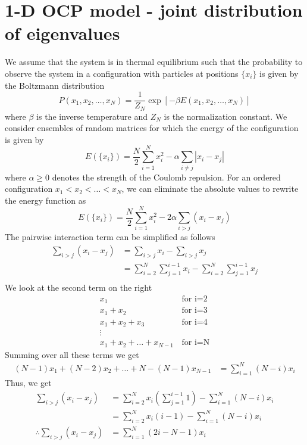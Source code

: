 \documentclass[11pt]{article}
\begin{document}
\section{1-D OCP model - joint distribution of eigenvalues}
We assume that the system is in thermal equilibrium such that the probability to observe the system in a configuration with particles at positions $\{x_i\}$ is given by the Boltzmann distribution
\begin{equation}
P(x_1,x_2,\hdots,x_N)=\frac{1}{Z_N}\exp[-\beta E(x_1,x_2,\hdots,x_N)]\label{eq-jpdf}
\end{equation}
where $\beta$ is the inverse temperature and $Z_N$ is the normalization constant. We consider ensembles of random matrices for which the energy of the configuration is given by
\begin{equation}
E(\{x_i\})=\frac{N}{2}\sum_{i=1}^Nx_i^2-\alpha \sum_{i\neq j}|x_i-x_j|\label{eq-energy}
\end{equation}
where $\alpha\geq 0$ denotes the strength of the Coulomb repulsion. For an ordered configuration $x_1<x_2<\hdots<x_N$, we can eliminate the absolute values to rewrite the energy function as
\begin{equation}
E(\{x_i\})=\frac{N}{2}\sum_{i=1}^Nx_i^2-2 \alpha \sum_{i>j} (x_i - x_j)
\end{equation}
The pairwise interaction term can be simplified as follows
\begin{align*}
\sum_{i>j} (x_i - x_j) &=\sum_{i>j}x_i - \sum_{i>j}x_j\\
& = \sum_{i=2}^N\sum_{j=1}^{i-1}x_i - \sum_{i=2}^N\sum_{j=1}^{i-1}x_j\\
\end{align*}
We look at the second term on the right
\begin{align*}
x_1 & \,\textrm{for i=2}\\
x_1 + x_2 &\,\textrm{for i=3}\\
x_1 + x_2 + x_3 & \,\textrm{for i=4}\\
\vdots\\
x_1 + x_2 + \hdots +x_{N-1}& \,\textrm{for i=N}
\end{align*}
Summing over all these terms we get
\begin{align*}
(N-1)x_1+(N-2)x_2+\hdots+{N-(N-1)}x_{N-1} & = \sum_{i=1}^N(N-i)x_i
\end{align*}
Thus, we get
\begin{align*}
\sum_{i>j} (x_i - x_j)& = \sum_{i=2}^Nx_i\left(\sum_{j=1}^{i-1}1\right)-\sum_{i=1}^N(N-i)x_i\\
& = \sum_{i=2}^Nx_i(i-1)-\sum_{i=1}^N(N-i)x_i\\
\therefore \sum_{i>j} (x_i - x_j) & = \sum_{i=1}^N(2i-N-1)x_i
\end{align*}
\end{document}
